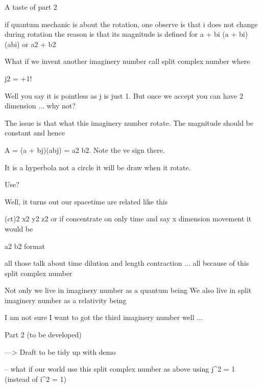 \documentclass[letterpaper,10pt,english]{jupyterBook}
\begin{document}
\begin{sphinxVerbatim}[commandchars=\\\{\}]
A taste of part 2

\PYGZhy{} if quantum mechanic is about the rotation, one observe is that i does not change during rotation
\PYGZhy{} the reason is that its magnitude is defined for a + bi \PYGZhy{}\PYGZgt{} (a + bi)(a\PYGZhy{}bi) or a\PYGZca{}2 + b\PYGZca{}2

What if we invent another imaginery number call split complex number where

j\PYGZca{}2 = +1! 

Well you say it is pointless as j is just 1.  But once we accept you can have 2 dimension ... why not?

The issue is that what this imaginery number rotate.  The magnitude should be constant and hence

A = (a + bj)(a\PYGZhy{}bj) = a\PYGZca{}2 \PYGZhy{} b\PYGZca{}2. Note the \PYGZhy{}ve sign there.

It is a hyperbola not a circle it will be draw when it rotate.

Use?

Well, it turns out our spacetime are related like this

(ct)\PYGZca{}2 \PYGZhy{} x\PYGZca{}2 \PYGZhy{} y\PYGZca{}2 \PYGZhy{} z\PYGZca{}2 or if concentrate on only time and say x dimension movement it would be

a\PYGZca{}2 \PYGZhy{} b\PYGZca{}2 format

all those talk about time dilution and length contraction ... all because of this split complex number
\end{sphinxVerbatim}

\begin{sphinxVerbatim}[commandchars=\\\{\}]
Not only we live in imaginery number as a quantum being 
We also live in split imaginery number as a relativity being

I am not sure I want to got the third imaginery number well ... 
\end{sphinxVerbatim}

\sphinxAtStartPar
Part 2 (to be developed)

\sphinxAtStartPar
—> Draft to be tidy up with demo

\sphinxAtStartPar
– what if our world use this split complex number as above using j\textasciicircum{}2 = 1 (instead of i\textasciicircum{}2 = \sphinxhyphen{}1)
\end{document}
